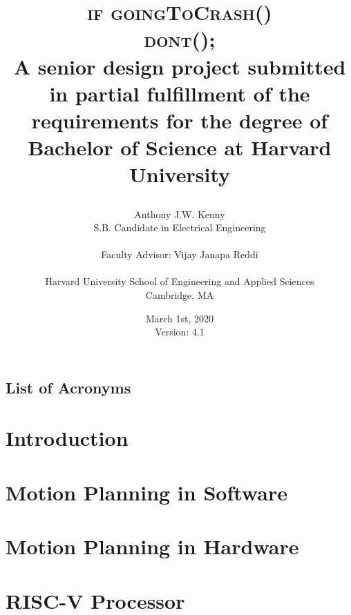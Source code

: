 \documentclass[
    11pt,           %
    letterpaper,    %
    oneside         %
]{report}           %
\title{\textsc{if goingToCrash()\\dont();} \\ 
    \bigskip
    \small{A senior design project submitted in partial fulfillment of the requirements for the degree of Bachelor of Science at Harvard University} \\
\author{Anthony J.W. Kenny \\
        \small{S.B. Candidate in Electrical Engineering} \\ \\
        Faculty Advisor: Vijay Janapa Reddi \\ \\
        Harvard University School of Engineering and Applied Sciences \\
        \small{Cambridge, MA}}
\date{March 1st, 2020 \\ 
    \small{Version: 4.1}}}
\begin{document}
\maketitle


    
    \clearpage

    \tableofcontents
    \clearpage

    \section*{List of Acronyms}
    

    \listofalgorithms
 
    \listoffigures

    \listoftables



\chapter{Introduction}
    


\chapter{Motion Planning in Software}
    \label{chap:MotionPlanningInSoftware}
    

\chapter{Motion Planning in Hardware}
    \label{chap:MotionPlanningInHardware}
    

\chapter{RISC-V Processor}
    \label{chap:RiscvProcessor}
    
\end{document}
